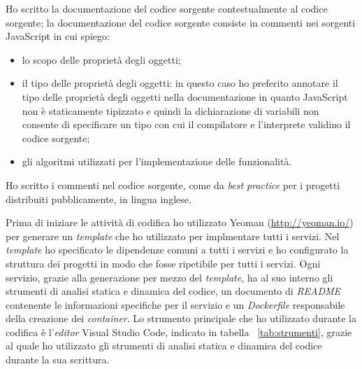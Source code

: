 Ho scritto la documentazione del codice sorgente contestualmente al codice sorgente; la documentazione del codice sorgente consiste in commenti nei sorgenti JavaScript in cui spiego:
\begin{itemize}
	\item lo scopo delle proprietà degli oggetti;
	\item il tipo delle proprietà degli oggetti: in questo caso ho preferito annotare il tipo delle proprietà degli oggetti nella documentazione in quanto JavaScript non è staticamente tipizzato e quindi la dichiarazione di variabili non consente di specificare un tipo con cui il compilatore e l'interprete validino il codice sorgente;
	\item gli algoritmi utilizzati per l'implementazione delle funzionalità.
\end{itemize}
Ho scritto i commenti nel codice sorgente, come da \emph{best practice} per i progetti distribuiti pubblicamente, in lingua inglese.

Prima di iniziare le attività di codifica ho utilizzato Yeoman (\url{http://yeoman.io/}) per generare un \emph{template} che ho utilizzato per implmentare tutti i servizi. Nel \emph{template} ho specificato le dipendenze comuni a tutti i servizi e ho configurato la struttura dei progetti in modo che fosse ripetibile per tutti i servizi.
Ogni servizio, grazie alla generazione per mezzo del \emph{template}, ha al suo interno gli strumenti di analisi statica e dinamica del codice, un documento di \emph{README} contenente le informazioni specifiche per il servizio e un \emph{Dockerfile} responsabile della creazione dei \emph{container}.
Lo strumento principale che ho utilizzato durante la codifica è l'\emph{editor} Visual Studio Code, indicato in tabella ~\ref{tab:strumenti}, grazie al quale ho utilizzato gli strumenti di analisi statica e dinamica del codice durante la sua scrittura.

